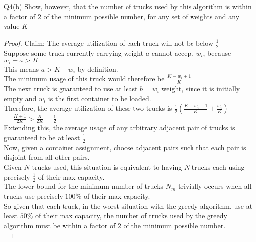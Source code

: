 \begin{problem}
    {Q4(b)}
    Show, however, that the number of trucks used by this algorithm is within a factor of $2$ of the minimum possible number, for any set of weights and any value $K$ \\
    \begin{proof}
        Claim: The average utilization of each truck will not be below $\frac{1}{2}$ \\
        Suppose some truck currently carrying weight $a$ cannot accept $w_i$, because $w_i + a > K$ \\
        This means $a > K - w_i$ by definition. \\
        The minimum usage of this truck would therefore be $\frac{K - w_i + 1}{K}$ \\
        The next truck is guaranteed to use at least $b = w_i$ weight, since it is initially empty and $w_i$ is the first container to be loaded. \\
        Therefore, the average utilization of these two trucks is $\frac{1}{2}\left(\frac{K - w_i + 1}{K} + \frac{w_i}{K}\right)$ \\
        $= \frac{K + 1}{2K} > \frac{K}{2K} = \frac{1}{2}$ \\
        Extending this, the average usage of any arbitrary adjacent pair of trucks is guaranteed to be at least $\frac{1}{2}$ \\
        Now, given a container assignment, choose adjacent pairs such that each pair is disjoint from all other pairs. \\
        Given $N$ trucks used, this situation is equivalent to having $N$ trucks each using precisely $\frac{1}{2}$ of their max capacity. \\
        The lower bound for the minimum number of trucks $N_m$ trivially occurs when all trucks use precisely $100\%$ of their max capacity. \\
        So given that each truck, in the worst situation with the greedy algorithm, use at least $50\%$ of their max capacity, the number of trucks
        used by the greedy algorithm must be within a factor of $2$ of the minimum possible number. \\
    \end{proof}
\end{problem}
